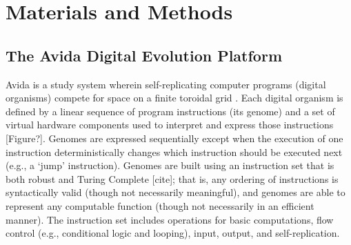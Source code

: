 

\section{Materials and Methods}


\subsection{The Avida Digital Evolution Platform}


Avida is a study system wherein self-replicating computer programs (digital organisms) compete for space on a finite toroidal grid \citep{ofria_avida:_2009}.
Each digital organism is defined by a linear sequence of program instructions (its genome) and a set of virtual hardware components used to interpret and express those instructions [Figure?].
Genomes are expressed sequentially except when the execution of one instruction deterministically changes which instruction should be executed next (e.g., a `jump' instruction). 
Genomes are built using an instruction set that is both robust and Turing Complete [cite]; that is, any ordering of instructions is syntactically valid (though not necessarily meaningful), and genomes are able to represent any computable function (though not necessarily in an efficient manner).
The instruction set includes operations for basic computations, flow control (e.g., conditional logic and looping), input, output, and self-replication.

